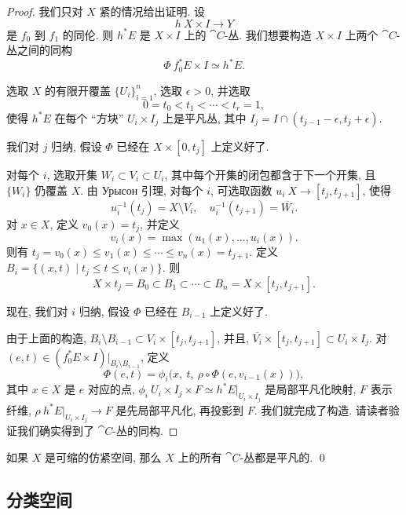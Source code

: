 \begin{proof}
    我们只对 $X$ 紧的情况给出证明. 设
    \[ h \: X \times I \to Y \]
    是 $f_0$ 到 $f_1$ 的同伦. 
    则 $h^* E$ 是 $X \times I$ 上的 $\cat{C}$-丛.
    我们想要构造 $X \times I$ 上两个 $\cat{C}$-丛之间的同构
    \[ \Phi \: f_0^* E \times I \simeq h^* E. \]

    选取 $X$ 的有限开覆盖 $\{ U_i \} _{i=1} ^n$, 选取 $\epsilon > 0$, 并选取
    \[ 0 = t_0 < t_1 < \cdots < t_r = 1, \]
    使得 $h^* E$ 在每个 ``方块'' $U_i \times I_j$ 上是平凡丛,
    其中 $I_j = I \cap (t_{j-1} - \epsilon, t_j + \epsilon)$.

    我们对 $j$ 归纳, 假设 $\Phi$ 已经在 $X \times [0, t_j]$ 上定义好了.

    对每个 $i$, 选取开集 $W_i \subset V_i \subset U_i$,
    其中每个开集的闭包都含于下一个开集, 且 $\{ W_i \}$ 仍覆盖 $X$.
    由 Урысон 引理, 对每个 $i$, 可选取函数 $u_i \: X \to [t_j, t_{j+1}]$, 使得 
    \[ u_i^{-1} (t_j) = X \setminus V_i, \quad u_i^{-1} (t_{j+1}) = \overline{W_i}. \]
    对 $x \in X$, 定义 $v_0 (x) = t_j$, 并定义
    \[ v_i (x) = \max (u_1 (x), \dotsc, u_i (x)). \]
    则有 $t_j = v_0 (x) \leq v_1 (x) \leq \cdots \leq v_n (x) = t_{j+1}$.
    定义 $B_i = \{ (x, t) \mid t_j \leq t \leq v_i (x) \}$. 则
    \[ X \times t_j = B_0 \subset B_1 \subset \cdots \subset B_n = X \times [t_j, t_{j+1}]. \]
    
    现在, 我们对 $i$ 归纳, 假设 $\Phi$ 已经在 $B_{i-1}$ 上定义好了.
    
    由于上面的构造, $B_i \setminus B_{i-1} \subset V_i \times [t_j, t_{j+1}]$,
    并且, $\overline{V_i} \times [t_j, t_{j+1}] \subset U_i \times I_j$.
    对 $(e, t) \in (f_0^* E \times I)|_{B_i \setminus B_{i-1}}$, 定义
    \[ \Phi (e, t) = \phi_i \bigl(x,\ t,\ \rho \circ \Phi (e, v_{i-1} (x))\bigr), \]
    其中 $x \in X$ 是 $e$ 对应的点,
    $\phi_i \: U_i \times I_j \times F \simeq h^* E |_{U_i \times I_j}$ 是局部平凡化映射, $F$ 表示纤维,
    $\rho \: h^* E |_{U_i \times I_j} \to F$ 是先局部平凡化, 再投影到 $F$. 
    我们就完成了构造. 请读者验证我们确实得到了 $\cat{C}$-丛的同构.
\end{proof}

\begin{corollary}
    如果 $X$ 是可缩的仿紧空间, 那么 $X$ 上的所有 $\cat{C}$-丛都是平凡的. \qed
\end{corollary}

\subsection{分类空间}

